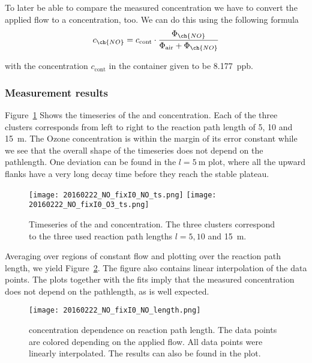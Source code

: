 To later be able to compare the measured  concentration we have
to convert the applied  flow to a concentration, too. We can
do this using the following formula
\begin{align*}
  c_{\ch{NO}} = c_{\text{cont}} \cdot \frac{\Phi_{\ch{NO}}}{\Phi_{\text{air}} + \Phi_{\ch{NO}}}
\end{align*}

with the concentration $c_{\text{cont}}$ in the  container
given to be \SI{8.177}{ppb}. 

\subsubsection{Measurement results}
\label{sec:no-result}

Figure~\ref{fig:ts} Shows the timeseries of the  and 
concentration. Each of the three clusters corresponds from left to
right to the reaction path length of \num{5}, \num{10} and
\SI{15}{\meter}. The Ozone concentration is within the margin of its
error constant while we see that the overall shape of the 
timeseries does not depend on the pathlength. One deviation can be
found in the $l = \SI{5}{\meter}$ plot, where all the upward flanks
have a very long decay time before they reach the stable plateau.

\begin{figure}[htbp]
  \centering
  \texttt{[image: 20160222\_NO\_fixI0\_NO\_ts.png]}
  \hfill
  \texttt{[image: 20160222\_NO\_fixI0\_O3\_ts.png]}
  \caption{Timeseries of the  and  concentration. The
    three clusters correspond to the three used reaction path lengths
    $l = 5, 10$ and \SI{15}{\meter}.}
  \label{fig:ts}
\end{figure}

Averaging over regions of constant flow and plotting over the reaction
path length, we yield Figure~\ref{fig:no-length}. The figure also
contains linear interpolation of the data points. The plots together
with the fits imply that the measured  concentration does not
depend on the pathlength, as is well expected.

\begin{figure}[htbp]
  \centering
  \texttt{[image: 20160222\_NO\_fixI0\_NO\_length.png]}
  \caption{ concentration dependence on reaction path
    length. The data points are colored depending on the applied
     flow. All data points were linearly interpolated. The
    results can also be found in the plot.}
  \label{fig:no-length}
\end{figure}

